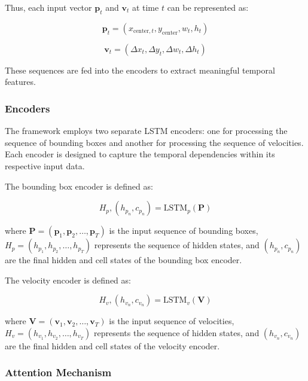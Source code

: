 \documentclass[12pt,oneside]{book} %
\begin{document}
Thus, each input vector $\mathbf{p}_t$ and $\mathbf{v}_t$ at time $t$ can be
represented as:

\begin{equation}
    \mathbf{p}_t = (x_{\text{center}, t}, y_{\text{center}}, w_t, h_t)
\end{equation}

\begin{equation}
    \mathbf{v}_t = (\Delta x_t, \Delta y_t, \Delta w_t, \Delta h_t)
\end{equation}

These sequences are fed into the encoders to extract meaningful temporal
features.

\subsubsection{Encoders}
The framework employs two separate LSTM encoders: one for processing the
sequence of bounding boxes and another for processing the sequence of
velocities. Each encoder is designed to capture the temporal dependencies
within its respective input data.

The bounding box encoder is defined as:

\begin{equation}
    H_p, (h_{p_n}, c_{p_n}) = \text{LSTM}_p(\mathbf{P})
\end{equation}

where $\mathbf{P} = (\mathbf{p}_1, \mathbf{p}_2, \ldots, \mathbf{p}_T)$ is the
input sequence of bounding boxes, $H_p = (h_{p_1}, h_{p_2}, \ldots, h_{p_T})$
represents the sequence of hidden states, and $(h_{p_n}, c_{p_n})$ are the
final hidden and cell states of the bounding box encoder.

The velocity encoder is defined as:

\begin{equation}
    H_v, (h_{v_n}, c_{v_n}) = \text{LSTM}_v(\mathbf{V})
\end{equation}

where $\mathbf{V} = (\mathbf{v}_1, \mathbf{v}_2, \ldots, \mathbf{v}_T)$ is the
input sequence of velocities, $H_v = (h_{v_1}, h_{v_2}, \ldots, h_{v_T})$
represents the sequence of hidden states, and $(h_{v_n}, c_{v_n})$ are the
final hidden and cell states of the velocity encoder.

\subsubsection{Attention Mechanism}
\end{document}
